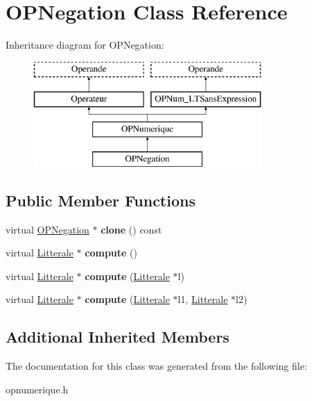 \hypertarget{class_o_p_negation}{}\section{O\+P\+Negation Class Reference}
\label{class_o_p_negation}
Inheritance diagram for O\+P\+Negation\+:\begin{figure}[H]
\begin{center}
\leavevmode
\includegraphics[height=4.000000cm]{class_o_p_negation}
\end{center}
\end{figure}
\subsection*{Public Member Functions}
\begin{DoxyCompactItemize}
\item 
virtual \hyperlink{class_o_p_negation}{O\+P\+Negation} $\ast$ {\bfseries clone} () const \hypertarget{class_o_p_negation_a3353e0c948369ee06813ee5a2f96cb35}{}\label{class_o_p_negation_a3353e0c948369ee06813ee5a2f96cb35}

\item 
virtual \hyperlink{class_litterale}{Litterale} $\ast$ {\bfseries compute} ()\hypertarget{class_o_p_negation_a8004e64197495a2f446a90b4f2e4be80}{}\label{class_o_p_negation_a8004e64197495a2f446a90b4f2e4be80}

\item 
virtual \hyperlink{class_litterale}{Litterale} $\ast$ {\bfseries compute} (\hyperlink{class_litterale}{Litterale} $\ast$l)\hypertarget{class_o_p_negation_ae5f073cf3260ff58a4a690ae58e96a4b}{}\label{class_o_p_negation_ae5f073cf3260ff58a4a690ae58e96a4b}

\item 
virtual \hyperlink{class_litterale}{Litterale} $\ast$ {\bfseries compute} (\hyperlink{class_litterale}{Litterale} $\ast$l1, \hyperlink{class_litterale}{Litterale} $\ast$l2)\hypertarget{class_o_p_negation_ae98d4c15e85f6e2b7e36da56adcb7a2b}{}\label{class_o_p_negation_ae98d4c15e85f6e2b7e36da56adcb7a2b}

\end{DoxyCompactItemize}
\subsection*{Additional Inherited Members}


The documentation for this class was generated from the following file\+:\begin{DoxyCompactItemize}
\item 
opnumerique.\+h\end{DoxyCompactItemize}

